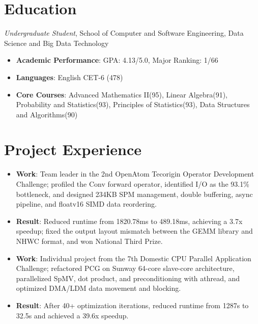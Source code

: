 \section{Education}
\textit{Undergraduate Student}, School of Computer and Software Engineering, Data Science and Big Data Technology
\begin{itemize}
  \item \textbf{Academic Performance}: GPA: 4.13/5.0, Major Ranking: 1/66
  \item \textbf{Languages}: English CET-6 (478)
  \item \textbf{Core Courses}: Advanced Mathematics II(95), Linear Algebra(91), Probability and Statistics(93), Principles of Statistics(93), Data Structures and Algorithms(90)
\end{itemize}

\section{Project Experience}

\begin{itemize}
  \item \textbf{Work}: Team leader in the 2nd OpenAtom Tecorigin Operator Development Challenge; profiled the Conv forward operator, identified I/O as the 93.1\% bottleneck, and designed 234KB SPM management, double buffering, async pipeline, and floatv16 SIMD data reordering.
  \item \textbf{Result}: Reduced runtime from 1820.78ms to 489.18ms, achieving a 3.7x speedup; fixed the output layout mismatch between the GEMM library and NHWC format, and won National Third Prize.
\end{itemize}

\begin{itemize}
  \item \textbf{Work}: Individual project from the 7th Domestic CPU Parallel Application Challenge; refactored PCG on Sunway 64-core slave-core architecture, parallelized SpMV, dot product, and preconditioning with athread, and optimized DMA/LDM data movement and blocking.
  \item \textbf{Result}: After 40+ optimization iterations, reduced runtime from 1287s to 32.5s and achieved a 39.6x speedup.
\end{itemize}

